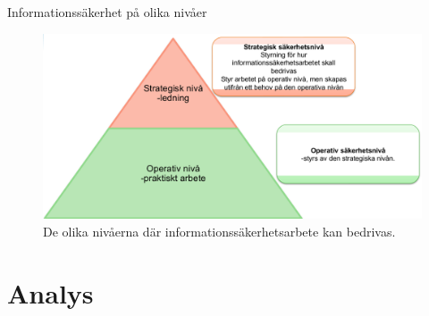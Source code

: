 \documentclass{beamer}
\begin{document}
\begin{frame}{Informationssäkerhet på olika nivåer}
  \begin{figure}
    \includegraphics[width=\textwidth]{infosak-levels.png}
    \caption{De olika nivåerna där informationssäkerhetsarbete kan bedrivas.}
  \end{figure}
\end{frame}


\section{Analys}
\end{document}
